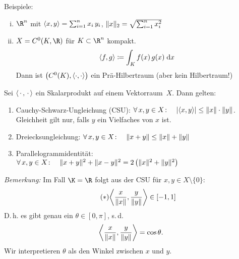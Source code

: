 \begin{thEmpty}[Skalarprodukt]
\begin{enumerate}[(a)]
            \pagebreak[2]
            Beispiele:
            \begin{enumerate}[i)]
                \item 
                    $\R^n$ mit $\SP{x,y} = \isum[1]^n x_i\,y_i$, 
                    $\norm{x}_2 = \sqrt{\isum[1]^n x_i^2}$
                \item
                    $X=C^0(K,\R)$ für $K\subset\R^n$ kompakt.
                    \[ \SP{f,g} \defeq \int_K f(x)\,g(x)\dif{x} \]
                    Dann ist $\bigl( C^0(K), \SP{\cdot,\cdot} \bigr)$ ein
                    Prä-Hilbertraum (aber kein Hilbertraum!)
            \end{enumerate}
    \end{enumerate}
\end{thEmpty}

\begin{thSatz}\label{vl02:satz2.8}
    Sei $\emptySP$ ein Skalarprodukt auf einem Vektorraum~$X$. Dann gelten:
    \begin{enumerate}[(1)]
        \item \label{vl02:satz2.8:CSU}\label{vl02:CSU}
            Cauchy-Schwarz-Ungleichung (CSU): \quad
            $\forall\,x,y\in X\colon\quad
            \abs{\SP{x,y}} \leq \norm x\cdot\norm y$.\\
            Gleichheit gilt nur, falls $y$ ein Vielfaches von $x$ ist.

        \item
            Dreiecksungleichung: \quad
            $\forall\,x,y\in X\colon\quad \norm{x+y}\leq\norm x+\norm y$
            
        \item \label{vl02:satz2.8:parallelogramm}
            Parallelogrammidentität:\quad
            $\forall\,x,y\in X\colon\quad
                \norm{x+y}^2 + \norm{x-y}^2 = 2\left( \norm{x}^2+\norm{y}^2
                \right)$
    \end{enumerate}
\end{thSatz}

\emph{Bemerkung:} Im Fall $\K=\R$ folgt aus der CSU für $x,y\in X\setminus\{0\}$:
\[ \label{2.8star} \tag{$\ast$}
    \SP{ \frac{x}{\norm x}, \frac{y}{\norm y} } \in [-1,1]
\] 
D.\,h. es gibt genau ein $\theta\in[0,\pi]$, s.\,d. 
\[ \SP{ \frac{x}{\norm x}, \frac{y}{\norm y} } = \cos\theta 
. \]
Wir interpretieren $\theta$ als den Winkel zwischen $x$ und $y$.

